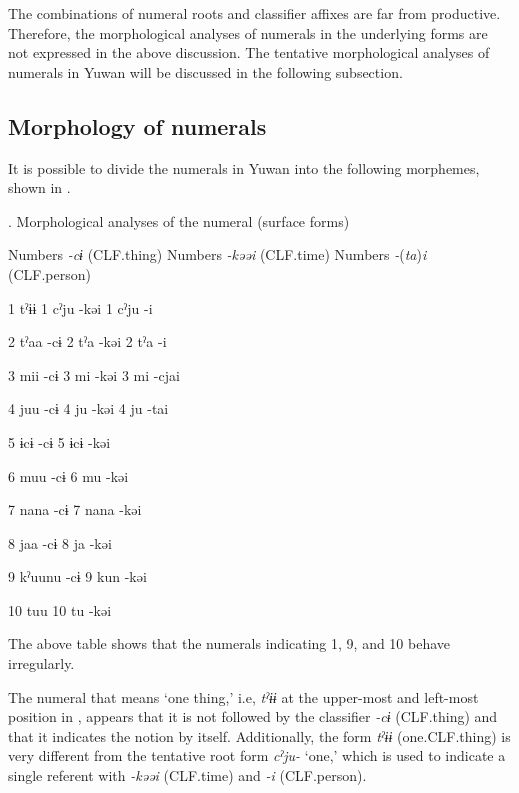 The combinations of numeral roots and classifier affixes are far from productive. Therefore, the morphological analyses of numerals in the underlying forms are not expressed in the above discussion. The tentative morphological analyses of numerals in Yuwan will be discussed in the following subsection.

\subsection{Morphology of numerals}

It is possible to divide the numerals in Yuwan into the following morphemes, shown in .

\begin{styleBeschriftung}
\textmd{}\textmd{. Morphological analyses of the numeral (surface forms)}
\end{styleBeschriftung}

Numbers  \textit{{}-cɨ} (CLF.thing)    Numbers  \textit{{}-kəəi} (CLF.time)    Numbers  \textit{{}-}(\textit{ta})\textit{i} (CLF.person)

1  tˀɨɨ      1  cˀju  {}-kəi    1  cˀju  {}-i

2  tˀaa  {}-cɨ    2  tˀa  {}-kəi    2  tˀa  {}-i

3  mii  {}-cɨ    3  mi  {}-kəi    3  mi  {}-cjai

4  juu  {}-cɨ    4  ju  {}-kəi    4  ju  {}-tai

5  ɨcɨ  {}-cɨ    5  ɨcɨ  {}-kəi        

6  muu  {}-cɨ    6  mu  {}-kəi        

7  nana  {}-cɨ    7  nana  {}-kəi        

8  jaa  {}-cɨ    8  ja  {}-kəi        

9  kˀuunu  {}-cɨ    9  kun  {}-kəi        

10  tuu      10  tu  {}-kəi        

\begin{styleBeschriftung}
\textmd{The above table shows that the numerals indicating 1, 9, and 10 behave irregularly.}
\end{styleBeschriftung}

\begin{styleBeschriftung}
\textmd{The numeral that means ‘one thing,’ i.e,} \textmd{\textit{tˀɨɨ}}\textmd{ at the upper-most and left-most position in , appears that it is not followed by the classifier} \textmd{\textit{{}-cɨ}}\textmd{ (CLF.thing) and} \textmd{that it indicates the notion by itself. Additionally, the form} \textmd{\textit{tˀɨɨ}}\textmd{ (one.CLF.thing) is very different from the tentative root form} \textmd{\textit{cˀju-}}\textmd{ ‘one,’ which is used to indicate a single referent with}\textmd{ \textit{-kəəi}}\textmd{ (CLF.time) and} \textmd{\textit{{}-i}}\textmd{ (CLF.person).}
\end{styleBeschriftung}

